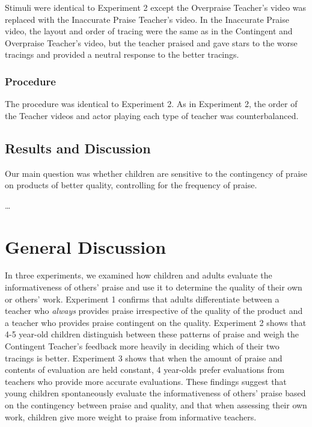 \documentclass[10pt, letterpaper]{article}
\begin{document}
Stimuli were identical to Experiment 2 except the Overpraise Teacher's
video was replaced with the Inaccurate Praise Teacher's video. In the
Inaccurate Praise video, the layout and order of tracing were the same
as in the Contingent and Overpraise Teacher's video, but the teacher
praised and gave stars to the worse tracings and provided a neutral
response to the better tracings.

\subsubsection{Procedure}\label{procedure-2}

The procedure was identical to Experiment 2. As in Experiment 2, the
order of the Teacher videos and actor playing each type of teacher was
counterbalanced.

\subsection{Results and Discussion}\label{results-and-discussion-2}

Our main question was whether children are sensitive to the contingency
of praise on products of better quality, controlling for the frequency
of praise.

\ldots{}

\section{General Discussion}\label{general-discussion}

In three experiments, we examined how children and adults evaluate the
informativeness of others' praise and use it to determine the quality of
their own or others' work. Experiment 1 confirms that adults
differentiate between a teacher who \textit{always} provides praise
irrespective of the quality of the product and a teacher who provides
praise contingent on the quality. Experiment 2 shows that 4-5 year-old
children distinguish between these patterns of praise and weigh the
Contingent Teacher's feedback more heavily in deciding which of their
two tracings is better. Experiment 3 shows that when the amount of
praise and contents of evaluation are held constant, 4 year-olds prefer
evaluations from teachers who provide more accurate evaluations. These
findings suggest that young children spontaneously evaluate the
informativeness of others' praise based on the contingency between
praise and quality, and that when assessing their own work, children
give more weight to praise from informative teachers.
\end{document}
